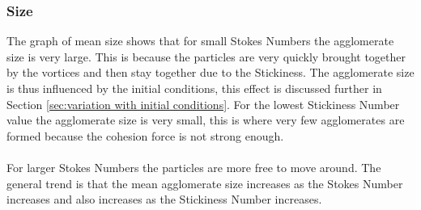 \documentclass[a4paper,11pt,titlepage]{report}
\begin{document}
\subsubsection{Size}
The graph of mean size shows that for small Stokes Numbers the agglomerate size is very large. This is because the particles are very quickly brought together by the vortices and then stay together due to the Stickiness. The agglomerate size is thus influenced by the initial conditions, this effect is discussed further in Section \ref{sec:variation with initial conditions}. For the lowest Stickiness Number value the agglomerate size is very small, this is where very few agglomerates are formed because the cohesion force is not strong enough.
\\\\For larger Stokes Numbers the particles are more free to move around. The general trend is that the mean agglomerate size increases as the Stokes Number increases and also increases as the Stickiness Number increases.
\end{document}
